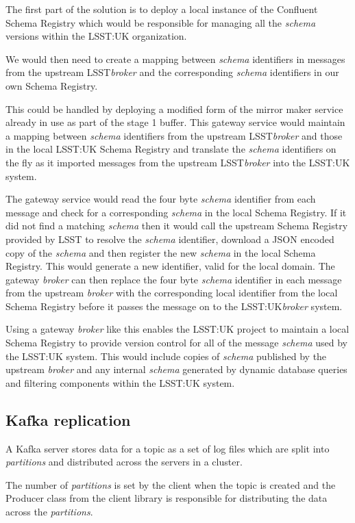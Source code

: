 \documentclass{article}
\newcommand{\json} {JSON\xspace}
\newcommand{\kafka} {Kafka\xspace}
\newcommand{\kfbroker} {\textit{broker}\xspace}
\newcommand{\kfpartitions} {\textit{partitions}\xspace}
\newcommand{\confluent} {Confluent\xspace}
\newcommand{\avschema} {\textit{schema}\xspace}
\newcommand{\conschemaregistry} {Schema Registry\xspace}
\newcommand{\stageone} {stage 1\xspace}
\newcommand{\lsst} {LSST\xspace}
\newcommand{\lsstuk} {LSST:UK\xspace}
\newcommand{\javaname}[1] {{\ttfamily\color{codeblue} #1}}
\begin{document}
The first part of the solution is to deploy a local instance of the \confluent \conschemaregistry which would be responsible for managing all the \avschema versions within the \lsstuk organization.

We would then need to create a mapping between \avschema identifiers in messages from the upstream \lsst \kfbroker and the corresponding \avschema identifiers in our own \conschemaregistry.

This could be handled by deploying a modified form of the mirror maker service already in use as part of the \stageone buffer.
This gateway service would maintain a mapping between \avschema identifiers from the upstream \lsst \kfbroker and those in the local \lsstuk \conschemaregistry and translate the \avschema identifiers on the fly as it imported messages from the upstream \lsst \kfbroker into the \lsstuk system.

The gateway service would read the four byte \avschema identifier from each message and check for a corresponding \avschema in the local \conschemaregistry. If it did not find a matching \avschema then it would call the upstream \conschemaregistry provided by \lsst to resolve the \avschema identifier, download a \json encoded copy of the \avschema and then register the new \avschema in the local \conschemaregistry. This would generate a new identifier, valid for the local domain.
The gateway \kfbroker can then replace the four byte \avschema identifier in each message from the upstream \kfbroker with the corresponding local identifier from the local \conschemaregistry before it passes the message on to the \lsstuk \kfbroker system.

Using a gateway \kfbroker like this enables the \lsstuk project to maintain a local \conschemaregistry to provide version control for all of the message \avschema used by the \lsstuk system. This would include copies of \avschema published by the upstream \kfbroker and any internal \avschema generated by dynamic database queries and filtering components within the \lsstuk system.

\subsection{Kafka replication}
\label{kafka-data-storage}

A \kafka server stores data for a topic as a set of log files which are split into \kfpartitions and distributed across the servers in a cluster.

The number of \kfpartitions is set by the client when the topic is created and the \javaname{Producer} class from the client library is responsible for distributing the data across the \kfpartitions.
\end{document}
